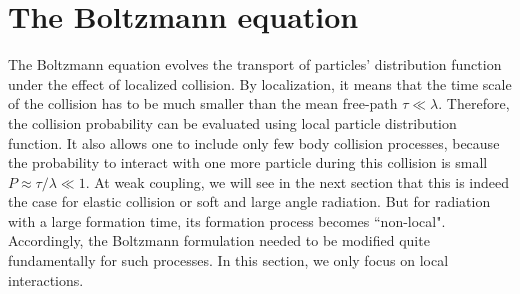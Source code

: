 \section{The Boltzmann equation}
The Boltzmann equation evolves the transport of particles' distribution function under the effect of localized collision. 
By localization, it means that the time scale of the collision has to be much smaller than the mean free-path $\tau \ll \lambda$. 
Therefore, the collision probability can be evaluated using local particle distribution function.
It also allows one to include only few body collision processes, because the probability to interact with one more particle during this collision is small $P \approx \tau/\lambda \ll 1$.
At weak coupling, we will see in the next section that this is indeed the case for elastic collision or soft and large angle radiation. 
But for radiation with a large formation time, its formation process becomes ``non-local".
Accordingly, the Boltzmann formulation needed to be modified quite fundamentally for such processes.
In this section, we only focus on local interactions.

